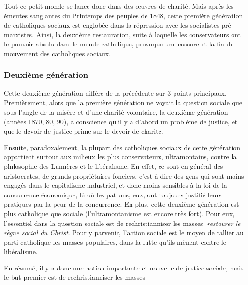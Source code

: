 \documentclass[12pt]{report}
\begin{document}

Tout ce petit monde se lance donc dans des œuvres de charité. Mais après les émeutes sanglantes du Printemps des peuples de 1848, cette première génération de catholiques sociaux est englobée dans la répression avec les socialistes pré-marxistes.
Ainsi, la deuxième restauration, suite à laquelle les conservateurs ont le pouvoir absolu dans le monde catholique, provoque une cassure et la fin du mouvement des catholiques sociaux.

\subsubsection{Deuxième génération}


Cette deuxième génération diffère de la précédente sur 3 points principaux.
Premièrement, alors que la première génération ne voyait la question sociale que sous l'angle de la misère et d'une charité volontaire, la deuxième génération (années 1870, 80, 90), a conscience qu'il y a d'abord un problème de justice, et que le devoir de justice prime sur le devoir de charité.

Ensuite, paradoxalement, la plupart des catholiques sociaux de cette génération appartient surtout aux milieux les plus conservateurs, ultramontains, contre la philosophie des Lumières et le libéralisme.
En effet, ce sont en général des aristocrates, de grands propriétaires fonciers, c'est-à-dire des gens qui sont moins engagés dans le capitalisme industriel, et donc moins sensibles à la loi de la concurrence économique, là où les patrons, eux, ont toujours justifié leurs pratiques par la peur de la concurrence.
En plus, cette deuxième génération est plus catholique que sociale (l'ultramontanisme est encore très fort). Pour eux, l'essentiel dans la question sociale est de rechristianniser les masses, \emph{restaurer le règne social du Christ}. Pour y parvenir, l'action sociale est le moyen de rallier au parti catholique les masses populaires, dans la lutte qu'ils mènent contre le libéralisme.

En résumé, il y a donc une notion importante et nouvelle de justice sociale, mais le but premier est de rechristianniser les masses.
\end{document}
